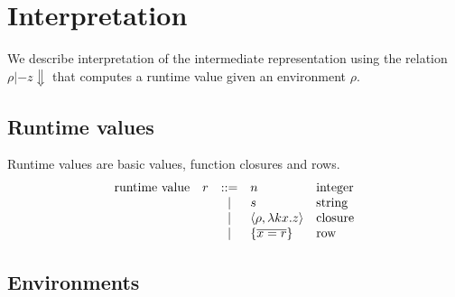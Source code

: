 \documentclass[11pt]{article}
\begin{document}
\newpage

\section{Interpretation}

\newcommand{\interp}[2]{#1 |- #2 \Downarrow}

\newcommand{\conf}[3]{\lambda #1 #2 . #3}
\newcommand{\conc}[2]{\lambda #1 . #2}

\newcommand{\clsf}[4]{\langle #1, \conf{#2}{#3}{#4} \rangle}
\newcommand{\clsc}[3]{\langle #1, \conc{#2}{#3} \rangle}
\newcommand{\clsfs}[5]{\langle #1, \repo{\lambda #2 #3 #4 . #5} \rangle}
\newcommand{\clsffs}[2]{\langle #1, \repo{#2} \rangle}

\newcommand{\extv}[3]{#1, #2 \mapsto #3}
\newcommand{\extc}[5]{\extv{#1}{#2}{\clsc{#3}{#4}{#5}}}
\newcommand{\extf}[6]{#1, \clsfs{#2}{#3}{#4}{#5}{#6}}
\newcommand{\extff}[2]{#1, \clsffs{#2}}

We describe interpretation of the intermediate representation using the relation $\interp{\rho}{z}$ that computes a runtime value given an environment $\rho$.

\subsection*{Runtime values}

Runtime values are basic values, function closures and rows.
\[
\begin{array}{rlcll}
\text{runtime value}
  & r & ::= & \intv{n}              & \text{integer}  \\
  &   & |   & \strv{s}              & \text{string} \\
  &   & |   & \clsf{\rho}{k}{x}{z}  & \text{closure} \\
  &   & |   & \recv{x}{r}           & \text{row} \\
\end{array}
\]

\subsection*{Environments}
\end{document}
